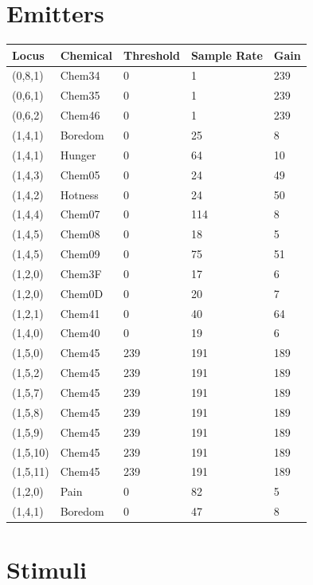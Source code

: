 \documentclass{article}
\begin{document}
\section*{Emitters}

\begin{longtable}{|p{2cm}|p{2cm}|p{2cm}|p{2cm}|p{2cm}|}
\hline
{\bf Locus} & {\bf Chemical} & {\bf Threshold} & {\bf Sample Rate} & {\bf Gain} \\ \hline
(0,8,1) & Chem34 & 0 & 1 & 239 \\ \hline
(0,6,1) & Chem35 & 0 & 1 & 239 \\ \hline
(0,6,2) & Chem46 & 0 & 1 & 239 \\ \hline
(1,4,1) & Boredom & 0 & 25 & 8 \\ \hline
(1,4,1) & Hunger & 0 & 64 & 10 \\ \hline
(1,4,3) & Chem05 & 0 & 24 & 49 \\ \hline
(1,4,2) & Hotness & 0 & 24 & 50 \\ \hline
(1,4,4) & Chem07 & 0 & 114 & 8 \\ \hline
(1,4,5) & Chem08 & 0 & 18 & 5 \\ \hline
(1,4,5) & Chem09 & 0 & 75 & 51 \\ \hline
(1,2,0) & Chem3F & 0 & 17 & 6 \\ \hline
(1,2,0) & Chem0D & 0 & 20 & 7 \\ \hline
(1,2,1) & Chem41 & 0 & 40 & 64 \\ \hline
(1,4,0) & Chem40 & 0 & 19 & 6 \\ \hline
(1,5,0) & Chem45 & 239 & 191 & 189 \\ \hline
(1,5,2) & Chem45 & 239 & 191 & 189 \\ \hline
(1,5,7) & Chem45 & 239 & 191 & 189 \\ \hline
(1,5,8) & Chem45 & 239 & 191 & 189 \\ \hline
(1,5,9) & Chem45 & 239 & 191 & 189 \\ \hline
(1,5,10) & Chem45 & 239 & 191 & 189 \\ \hline
(1,5,11) & Chem45 & 239 & 191 & 189 \\ \hline
(1,2,0) & Pain & 0 & 82 & 5 \\ \hline
(1,4,1) & Boredom & 0 & 47 & 8 \\ \hline
\end{longtable}

\section*{Stimuli}
\end{document}
